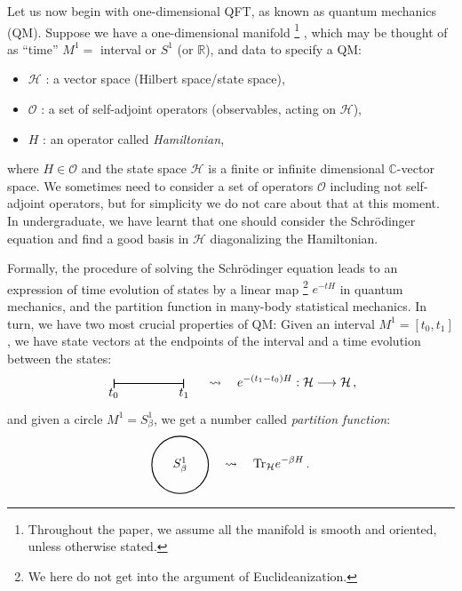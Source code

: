 Let us now begin with one-dimensional QFT, as known as quantum mechanics
(QM). Suppose we have a one-dimensional manifold%
%
\footnote{Throughout the paper, we assume all the manifold is smooth and oriented,
unless otherwise stated. }%
%
, which may be thought of as ``time'' $M^{1}=$ interval or $S^{1}$
(or $\mathbb{R}$), and data to specify a QM:
\begin{itemize}
 \item $\mathcal{H}$ : a vector space (Hilbert space/state space),
 \item $\mathcal{O}$ : a set of self-adjoint operators (observables, acting
on $\mathcal{H}$),
 \item $H$ : an operator called \emph{Hamiltonian},
\end{itemize}
where $H\in\mathcal{O}$ and the state space $\mathcal{H}$ is a finite
or infinite dimensional $\mathbb{C}$-vector space. We sometimes need
to consider a set of operators $\mathcal{O}$ including not self-adjoint
operators, but for simplicity we do not care about that at this moment.
In undergraduate, we have learnt that one should consider the Schr\"{o}dinger
equation and find a good basis in $\mathcal{H}$ diagonalizing the
Hamiltonian.

Formally, the procedure of solving the Schr\"{o}dinger equation leads
to an expression of time evolution of states by a linear map%
%
\footnote{We here do not get into the argument of Euclideanization.}
%
$e^{-tH}$ in quantum mechanics, and the partition function in many-body
statistical mechanics. In turn, we have two most crucial properties
of QM: Given an interval $M^{1}=\left[t_{0},t_{1}\right]$, we have
state vectors at the endpoints of the interval and a time evolution
between the states:
\begin{equation}
    \begin{tikzpicture}[scale=1.0, baseline=(x.base)]    \node (x) at (0,0) {\vphantom{x}};

        \draw[thick, arrows=|-|] (0,0) node[below=0.1] {$t_0$} -- (2,0) node[below=0.1] {$t_1$};

    \end{tikzpicture}
  \quad \rightsquigarrow \quad
  e^{-\left(t_{1}-t_{0}\right)H} : \mathcal{H}  \longrightarrow  \mathcal{H} \, ,
\end{equation}
 and given a circle $M^{1}=S_{\beta}^{1}$, we get a number called
\emph{partition function}:
\begin{equation}
    \begin{tikzpicture}[scale=0.8, baseline=(x.base)]    \node (x) at (0,0) {\vphantom{x}};

        \draw[thick] (0,0) circle[radius=1cm] node {$S^1_{\beta}$};

    \end{tikzpicture}
  \quad \rightsquigarrow \quad
  \mathrm{Tr}_{\mathcal{H}}  e^{-\beta H} \, .
\end{equation}


